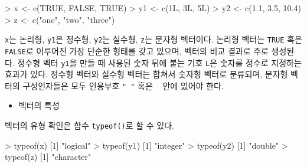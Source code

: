 \documentclass[
]{book}
\newenvironment{Shaded}{\begin{snugshade}}{\end{snugshade}}
\newcommand{\ConstantTok}[1]{\textcolor[rgb]{0.00,0.00,0.00}{#1}}
\newcommand{\DecValTok}[1]{\textcolor[rgb]{0.00,0.00,0.81}{#1}}
\newcommand{\FloatTok}[1]{\textcolor[rgb]{0.00,0.00,0.81}{#1}}
\newcommand{\FunctionTok}[1]{\textcolor[rgb]{0.00,0.00,0.00}{#1}}
\newcommand{\NormalTok}[1]{#1}
\newcommand{\OtherTok}[1]{\textcolor[rgb]{0.56,0.35,0.01}{#1}}
\newcommand{\SpecialCharTok}[1]{\textcolor[rgb]{0.00,0.00,0.00}{#1}}
\newcommand{\StringTok}[1]{\textcolor[rgb]{0.31,0.60,0.02}{#1}}
\providecommand{\tightlist}{%
  \setlength{\itemsep}{0pt}\setlength{\parskip}{0pt}}
\begin{document}
\begin{Shaded}
\begin{Highlighting}[]
\SpecialCharTok{\textgreater{}}\NormalTok{ x }\OtherTok{\textless{}{-}} \FunctionTok{c}\NormalTok{(}\ConstantTok{TRUE}\NormalTok{, }\ConstantTok{FALSE}\NormalTok{, }\ConstantTok{TRUE}\NormalTok{)}
\SpecialCharTok{\textgreater{}}\NormalTok{ y1 }\OtherTok{\textless{}{-}} \FunctionTok{c}\NormalTok{(1L, 3L, 5L)}
\SpecialCharTok{\textgreater{}}\NormalTok{ y2 }\OtherTok{\textless{}{-}} \FunctionTok{c}\NormalTok{(}\FloatTok{1.1}\NormalTok{, }\FloatTok{3.5}\NormalTok{, }\FloatTok{10.4}\NormalTok{)}
\SpecialCharTok{\textgreater{}}\NormalTok{ z }\OtherTok{\textless{}{-}} \FunctionTok{c}\NormalTok{(}\StringTok{"one"}\NormalTok{, }\StringTok{"two"}\NormalTok{, }\StringTok{"three"}\NormalTok{)}
\end{Highlighting}
\end{Shaded}

\texttt{x}는 논리형, \texttt{y1}은 정수형, \texttt{y2}는 실수형, \texttt{z}는 문자형 벡터이다.
논리형 벡터는 \texttt{TRUE} 혹은 \texttt{FALSE}로 이루어진 가장 단순한 형태를 갖고 있으며, 벡터의 비교 결과로 주로 생성된다.
정수형 벡터 \texttt{y1}을 만들 때 사용된 숫자 뒤에 붙는 기호 \texttt{L}은 숫자를 정수로 지정하는 효과가 있다.
정수형 벡터와 실수형 벡터는 합쳐서 숫자형 벡터로 분류되며, 문자형 벡터의 구성인자들은 모두 인용부호 \texttt{"\ "} 혹은 \texttt{\textquotesingle{}\ \textquotesingle{}} 안에 있어야 한다.

\begin{itemize}
\tightlist
\item
  벡터의 특성
\end{itemize}

벡터의 유형 확인은 함수 \texttt{typeof()}로 할 수 있다.

\begin{Shaded}
\begin{Highlighting}[]
\SpecialCharTok{\textgreater{}} \FunctionTok{typeof}\NormalTok{(x)}
\NormalTok{[}\DecValTok{1}\NormalTok{] }\StringTok{"logical"}
\SpecialCharTok{\textgreater{}} \FunctionTok{typeof}\NormalTok{(y1)}
\NormalTok{[}\DecValTok{1}\NormalTok{] }\StringTok{"integer"}
\SpecialCharTok{\textgreater{}} \FunctionTok{typeof}\NormalTok{(y2)}
\NormalTok{[}\DecValTok{1}\NormalTok{] }\StringTok{"double"}
\SpecialCharTok{\textgreater{}} \FunctionTok{typeof}\NormalTok{(z)}
\NormalTok{[}\DecValTok{1}\NormalTok{] }\StringTok{"character"}
\end{Highlighting}
\end{Shaded}
\end{document}
